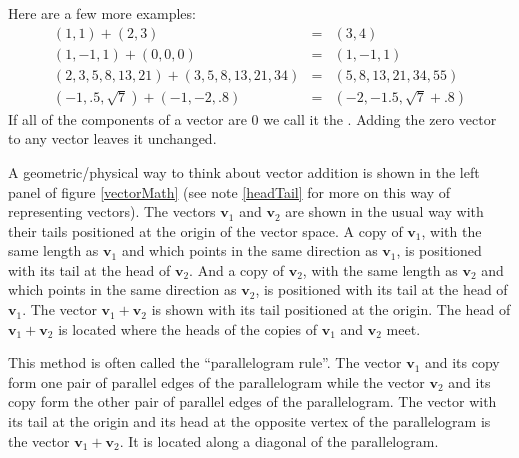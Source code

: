 Here are a few more examples:
\begin{eqnarray*}
(1,1) + (2,3) &=& (3,4)  \\
(1,-1,1) + (0,0,0) &=& (1,-1,1)  \\
(2,3,5,8,13,21) + (3,5,8,13,21,34) &=& (5,8,13,21,34,55) \\
(-1,.5,\sqrt{7}) + (-1,-2,.8) &=& (-2,-1.5,\sqrt{7}+.8)
\end{eqnarray*}
If all of the components of a vector are $0$ we call it the . Adding the zero vector to any vector leaves it unchanged.

   A geometric/physical way to think about vector addition is shown in the left 
panel of figure \ref{vectorMath} (see note \ref{headTail} for more on this way of representing vectors). The vectors $\mathbf{v}_1$ and 
$\mathbf{v}_2$ are shown in the usual way with their tails positioned at the 
origin of the vector space. A copy of $\mathbf{v}_1$, with the same length as 
$\mathbf{v}_1$ and which points in the same direction as $\mathbf{v}_1$, is 
positioned with its tail at the head of $\mathbf{v}_2$. And a copy of 
$\mathbf{v}_2$, with the same length as $\mathbf{v}_2$ and which points in the 
same direction as $\mathbf{v}_2$, is positioned with its tail at the head of 
$\mathbf{v}_1$. The vector $\mathbf{v}_1 + \mathbf{v}_2$ is shown with its 
tail positioned at the origin. The head of $\mathbf{v}_1 + \mathbf{v}_2$ is 
located where the heads of the copies of $\mathbf{v}_1$ and $\mathbf{v}_2$ 
meet. 

   This method is often called the ``parallelogram rule''. The vector 
$\mathbf{v}_1$ and its copy form one pair of parallel edges of the 
parallelogram while the vector $\mathbf{v}_2$ and its copy form the other pair 
of parallel edges of the parallelogram. The vector with its tail at the origin 
and its head at the opposite vertex of the parallelogram is the vector 
$\mathbf{v}_1 + \mathbf{v}_2$. It is located along a diagonal of the 
parallelogram. 


